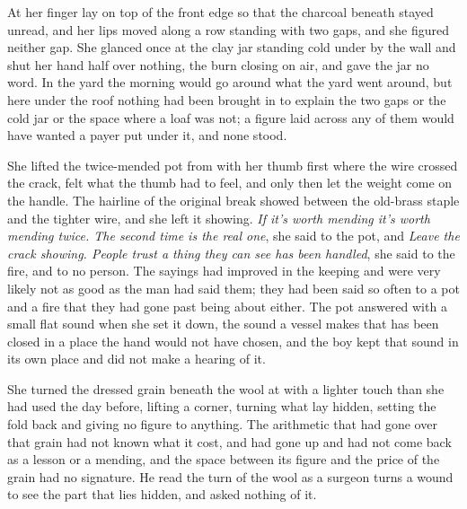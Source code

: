 At  her finger lay on top of the front edge so that the charcoal beneath stayed unread, and her lips moved along a row standing with two gaps, and she figured neither gap. She glanced once at the clay jar standing cold under  by the wall and shut her hand half over nothing, the burn closing on air, and gave the jar no word. In the yard the morning would go around what the yard went around, but here under the roof nothing had been brought in to explain the two gaps or the cold jar or the space where a loaf was not; a figure laid across any of them would have wanted a payer put under it, and none stood.

She lifted the twice-mended pot from  with her thumb first where the wire crossed the crack, felt what the thumb had to feel, and only then let the weight come on the handle. The hairline of the original break showed between the old-brass staple and the tighter wire, and she left it showing. \emph{If it's worth mending it's worth mending twice. The second time is the real one}, she said to the pot, and \emph{Leave the crack showing. People trust a thing they can see has been handled}, she said to the fire, and to no person. The sayings had improved in the keeping and were very likely not as good as the man had said them; they had been said so often to a pot and a fire that they had gone past being about either. The pot answered with a small flat sound when she set it down, the sound a vessel makes that has been closed in a place the hand would not have chosen, and the boy kept that sound in its own place and did not make a hearing of it.

She turned the dressed grain beneath the wool at  with a lighter touch than she had used the day before, lifting a corner, turning what lay hidden, setting the fold back and giving no figure to anything. The arithmetic that had gone over that grain had not known what it cost, and had gone up  and had not come back as a lesson or a mending, and the space between its figure and the price of the grain had no signature. He read the turn of the wool as a surgeon turns a wound to see the part that lies hidden, and asked nothing of it.

